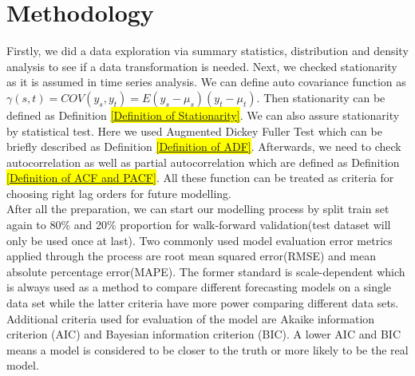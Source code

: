 \section{Methodology}
Firstly, we did a data exploration via summary statistics, distribution and density analysis to see if a data transformation is needed. Next, we checked stationarity as it is assumed in time series analysis. We can define auto covariance function as $\gamma(s,t)=COV(y_s,y_t)=E(y_s-\mu_s)(y_t-\mu_t)$. Then stationarity can be defined as Definition \hl{\ref{Definition of Stationarity}}. We can also assure stationarity by statistical test. Here we used Augmented Dickey Fuller Test which can be briefly described as Definition \hl{\ref{Definition of ADF}}. Afterwards, we need to check autocorrelation as well as partial autocorrelation which are defined as Definition \hl{\ref{Definition of ACF and PACF}}. All these function can be treated as criteria for choosing right lag orders for future modelling.\\
\indent After all the preparation, we can start our modelling process by split train set again to 80\% and 20\% proportion for walk-forward validation(test dataset will only be used once at last). Two commonly used model evaluation error metrics applied through the process are root mean squared error(RMSE) and mean absolute percentage error(MAPE). The former standard is scale-dependent which is always used as a method to compare different forecasting models on a single data set while the latter criteria have more power comparing different data sets. Additional criteria used for evaluation of the model are Akaike information criterion (AIC) and Bayesian information criterion (BIC). A lower AIC and BIC means a model is considered to be closer to the truth or more likely to be the real model. \\
